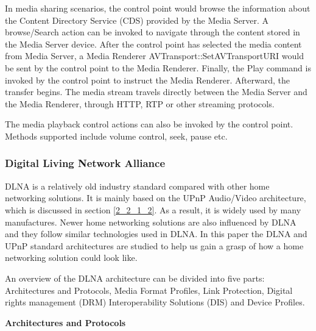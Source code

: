 In media sharing scenarios, the control point would browse the information about 
the Content Directory Service (CDS) provided by the Media Server. A 
browse/Search action can be invoked to navigate through the content stored in 
the Media Server device. After the control point has selected the media content from 
Media Server, a Media Renderer AVTransport::SetAVTransportURI would be sent by 
the control point to the Media Renderer. Finally, the Play command is invoked by 
the control point to instruct the Media Renderer. Afterward, the transfer begins. The media 
stream travels directly between the Media Server and the Media Renderer, through HTTP, 
RTP or other streaming protocols.

The media playback control actions can also be invoked by the control point. Methods 
supported include volume control, seek, pause etc. 

\subsubsection[DLNA]{Digital Living Network Alliance\label{2_2_2}} 
DLNA is a relatively old industry standard compared with other home networking 
solutions. It is mainly based on the UPnP Audio/Video architecture, which is 
discussed in section \ref{2_2_1_2}. As a result, it is widely used by many manufactures. Newer 
home networking solutions are also influenced by DLNA and they follow similar 
technologies used in DLNA. In this paper the DLNA and UPnP standard architectures are studied to help us gain a grasp of how a home networking solution could look like.

An overview of the DLNA architecture \cite{dlna_guideline} can be divided into
five parts: Architectures and Protocols, Media Format Profiles, Link Protection,
Digital rights management (DRM) Interoperability Solutions (DIS) and Device
Profiles.

\textbf{Architectures and Protocols}

